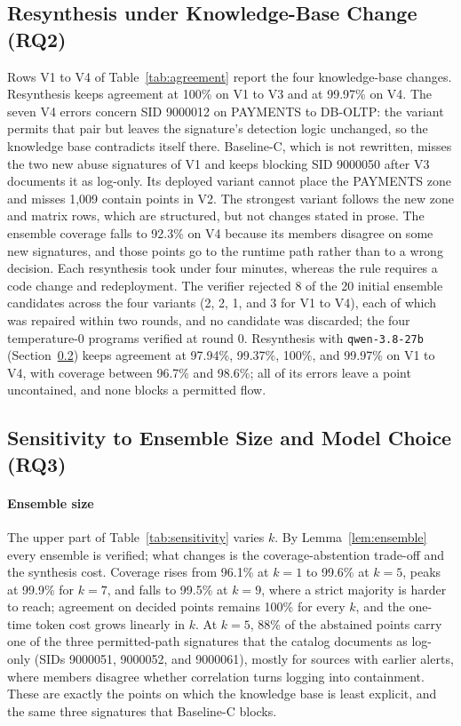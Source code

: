 \documentclass[final,5p]{elsarticle}
\begin{document}
\subsection{Resynthesis under Knowledge-Base Change (RQ2)}
\label{sec:drift}

Rows V1 to V4 of Table~\ref{tab:agreement} report the four knowledge-base changes. Resynthesis keeps agreement at 100\% on V1 to V3 and at 99.97\% on V4. The seven V4 errors concern SID 9000012 on PAYMENTS to DB-OLTP: the variant permits that pair but leaves the signature's detection logic unchanged, so the knowledge base contradicts itself there. Baseline-C, which is not rewritten, misses the two new abuse signatures of V1 and keeps blocking SID 9000050 after V3 documents it as log-only. Its deployed variant cannot place the PAYMENTS zone and misses 1,009 contain points in V2. The strongest variant follows the new zone and matrix rows, which are structured, but not changes stated in prose. The ensemble coverage falls to 92.3\% on V4 because its members disagree on some new signatures, and those points go to the runtime path rather than to a wrong decision. Each resynthesis took under four minutes, whereas the rule requires a code change and redeployment. The verifier rejected 8 of the 20 initial ensemble candidates across the four variants (2, 2, 1, and 3 for V1 to V4), each of which was repaired within two rounds, and no candidate was discarded; the four temperature-0 programs verified at round 0. Resynthesis with \texttt{qwen-3.8-27b} (Section~\ref{sec:cross_model}) keeps agreement at 97.94\%, 99.37\%, 100\%, and 99.97\% on V1 to V4, with coverage between 96.7\% and 98.6\%; all of its errors leave a point uncontained, and none blocks a permitted flow.

\subsection{Sensitivity to Ensemble Size and Model Choice (RQ3)}
\label{sec:cross_model}

\paragraph{Ensemble size}
The upper part of Table~\ref{tab:sensitivity} varies $k$. By Lemma~\ref{lem:ensemble} every ensemble is verified; what changes is the coverage-abstention trade-off and the synthesis cost. Coverage rises from 96.1\% at $k=1$ to 99.6\% at $k=5$, peaks at 99.9\% for $k=7$, and falls to 99.5\% at $k=9$, where a strict majority is harder to reach; agreement on decided points remains 100\% for every $k$, and the one-time token cost grows linearly in $k$. At $k=5$, 88\% of the abstained points carry one of the three permitted-path signatures that the catalog documents as log-only (SIDs 9000051, 9000052, and 9000061), mostly for sources with earlier alerts, where members disagree whether correlation turns logging into containment. These are exactly the points on which the knowledge base is least explicit, and the same three signatures that Baseline-C blocks.
\end{document}
